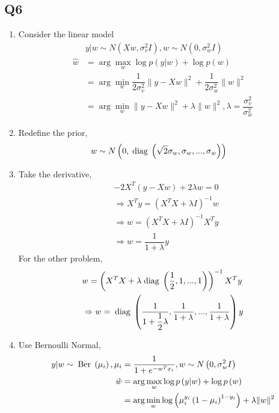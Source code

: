 \documentclass{article}
\begin{document}
\subsection{Q6}
\begin{enumerate}
\item Consider the linear model
\begin{align*}
&y  | w \sim  N\left(X w, \sigma_{v}^{2} I\right), w \sim  N\left(0, \sigma^{2}_{w} I \right)
\\ \hat{w} &= \arg\displaystyle\max_{w} \log p\left(y | w\right) + \log p\left(w \right)
\\ &= \arg\displaystyle\min_{w} \dfrac{1}{2 \sigma_{v}^{2}} \| y - X w \|^{2} + \dfrac{1}{2 \sigma_{w}^{2}} \| w \|^{2}
\\ &= \arg\displaystyle\min_{w} \| y - X w \|^{2} + \lambda \| w \|^{2}, \lambda = \dfrac{\sigma_{v}^{2}}{\sigma_{w}^{2}}
\end{align*}
\item Redefine the prior,
\begin{align*}
&w  \sim  N\left(0, \text{\;diag\;} \left(\sqrt{2} \sigma_{w}, \sigma_{w}, ..., \sigma_{w}\right)\right)
\end{align*}
\item Take the derivative,
\begin{align*}
&  -2 X^{T} \left(y - X w\right) + 2 \lambda w = 0
\\ &\Rightarrow  X^{T} y = \left(X^{T} X + \lambda I\right)^{-1} w 
\\ &\Rightarrow  w = \left(X^{T} X + \lambda I\right)^{-1} X^{T} y 
\\ &\Rightarrow  w = \dfrac{1}{1 + \lambda} y 
\end{align*}
For the other problem,
\begin{align*}
&  w = \left(X^{T} X + \lambda \text{\;diag\;} \left(\dfrac{1}{2}, 1, ..., 1\right) \right)^{-1} X^{T} y 
\\ &\Rightarrow  w = \text{\;diag\;} \left(\dfrac{1}{1 + \dfrac{1}{2} \lambda}, \dfrac{1}{1 + \lambda}, ..., \dfrac{1}{1 + \lambda}\right) y 
\end{align*}
\item Use Bernoulli Normal,
\begin{align*}
y  | w \sim  \text{\;Ber\;} \left(\mu_{i}\right), \mu_{i} &= \dfrac{1}{1 + e^{- w^{T} x_{i}}}, w \sim  N\left(0, \sigma_{w}^{2} I \right)
\\ \hat{w} &= \arg\displaystyle\max_{w} \log p\left(y | w\right) + \log p\left(w \right)
\\ &= \arg\displaystyle\min_{w} \log\left(\mu_{i}^{y_{i}} \left(1 - \mu_{i}\right)^{1 - y_{i}}\right) + \lambda \| w \|^{2}

\end{align*}
\end{enumerate}
\end{document}
